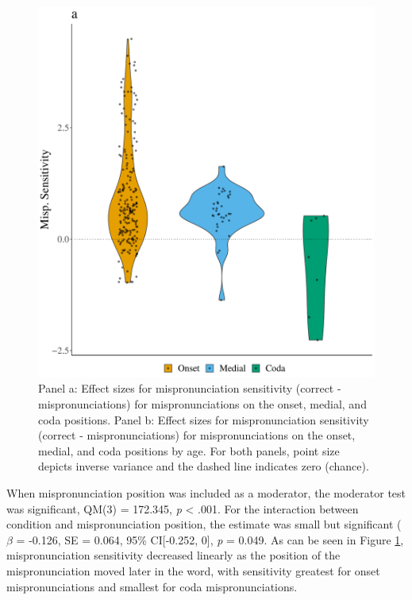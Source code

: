 \documentclass[man]{apa6}
\begin{document}
\begin{figure}
\centering
\includegraphics{VonHolzenBergmann_MPMetaAnalysis_files/figure-latex/PlotMispPosit-1.pdf}
\caption{\label{fig:PlotMispPosit}Panel a: Effect sizes for mispronunciation sensitivity (correct - mispronunciations) for mispronunciations on the onset, medial, and coda positions. Panel b: Effect sizes for mispronunciation sensitivity (correct - mispronunciations) for mispronunciations on the onset, medial, and coda positions by age. For both panels, point size depicts inverse variance and the dashed line indicates zero (chance).}
\end{figure}

When mispronunciation position was included as a moderator, the moderator test was significant, QM(3) = 172.345, \emph{p} \textless{} .001. For the interaction between condition and mispronunciation position, the estimate was small but significant (\(\beta\) = -0.126, SE = 0.064, 95\% CI{[}-0.252, 0{]}, \emph{p} = 0.049. As can be seen in Figure \ref{fig:PlotMispPosit}, mispronunciation sensitivity decreased linearly as the position of the mispronunciation moved later in the word, with sensitivity greatest for onset mispronunciations and smallest for coda mispronunciations.
\end{document}
